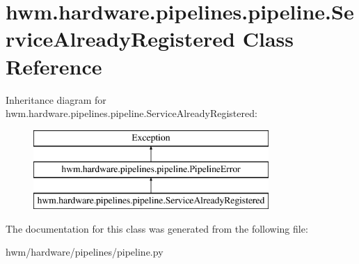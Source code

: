 \hypertarget{classhwm_1_1hardware_1_1pipelines_1_1pipeline_1_1_service_already_registered}{\section{hwm.\-hardware.\-pipelines.\-pipeline.\-Service\-Already\-Registered Class Reference}
\label{classhwm_1_1hardware_1_1pipelines_1_1pipeline_1_1_service_already_registered}
}
Inheritance diagram for hwm.\-hardware.\-pipelines.\-pipeline.\-Service\-Already\-Registered\-:\begin{figure}[H]
\begin{center}
\leavevmode
\includegraphics[height=3.000000cm]{classhwm_1_1hardware_1_1pipelines_1_1pipeline_1_1_service_already_registered}
\end{center}
\end{figure}


The documentation for this class was generated from the following file\-:\begin{DoxyCompactItemize}
\item 
hwm/hardware/pipelines/pipeline.\-py\end{DoxyCompactItemize}
